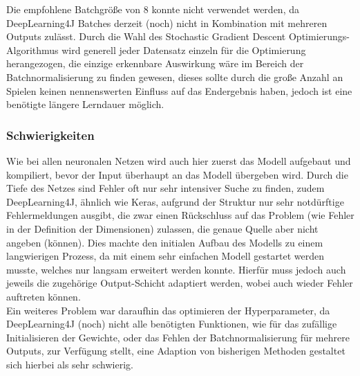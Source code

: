 \documentclass[12pt,a4paper]{article}
\begin{document}
Die empfohlene Batchgröße von 8 konnte nicht verwendet werden, da DeepLearning4J Batches derzeit (noch) nicht in Kombination mit mehreren Outputs zulässt. Durch die Wahl des Stochastic Gradient Descent Optimierungs-Algorithmus wird generell jeder Datensatz einzeln für die Optimierung herangezogen, die einzige erkennbare Auswirkung wäre im Bereich der Batchnormalisierung zu finden gewesen, dieses sollte durch die große Anzahl an Spielen keinen nennenswerten Einfluss auf das Endergebnis haben, jedoch ist eine benötigte längere Lerndauer möglich. 

\subsubsection{Schwierigkeiten}
Wie bei allen neuronalen Netzen wird auch hier zuerst das Modell aufgebaut und kompiliert, bevor der Input überhaupt an das Modell übergeben wird. Durch die Tiefe des Netzes sind Fehler oft nur sehr intensiver Suche zu finden, zudem DeepLearning4J, ähnlich wie Keras, aufgrund der Struktur nur sehr notdürftige Fehlermeldungen ausgibt, die zwar einen Rückschluss auf das Problem (wie Fehler in der Definition der Dimensionen) zulassen, die genaue Quelle aber nicht angeben (können). Dies machte den initialen Aufbau des Modells zu einem langwierigen Prozess, da mit einem sehr einfachen Modell gestartet werden musste, welches nur langsam erweitert werden konnte. Hierfür muss jedoch auch jeweils die zugehörige Output-Schicht adaptiert werden, wobei auch wieder Fehler auftreten können.\\
Ein weiteres Problem war daraufhin das optimieren der Hyperparameter, da DeepLearning4J (noch) nicht alle benötigten Funktionen, wie für das zufällige Initialisieren der Gewichte, oder das Fehlen der Batchnormalisierung für mehrere Outputs, zur Verfügung stellt, eine Adaption von bisherigen Methoden gestaltet sich hierbei als sehr schwierig. 


\newpage

\end{document}
